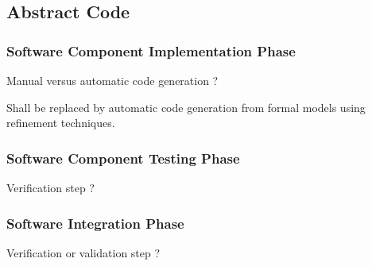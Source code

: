 \subsection{Abstract Code}



\subsubsection{Software Component Implementation Phase}
\label{sec:softw-comp-impl}

\tbc

\begin{issue}
Manual versus automatic code generation ?
\end{issue}
Shall be replaced by automatic code generation from formal models using
refinement techniques.

\subsubsection{Software Component Testing Phase}
\label{sec:softw-comp-test}

\begin{issue}
Verification step ?
\end{issue}

\subsubsection{Software Integration Phase}
\label{sec:softw-integr-phase}

\begin{issue}
Verification or validation step ?
\end{issue}

